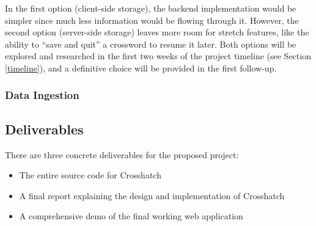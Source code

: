 \documentclass{article}
\begin{document}
In the first option (client-side storage), the backend implementation would be simpler since much less information
would be flowing through it. However, the second option (server-side storage) leaves more room
for stretch features, like the ability to ``save and quit'' a crossword to resume it later.
Both options will be explored and researched in the first two weeks of the project timeline (see Section \ref{timeline}), and a definitive choice will be provided in the first follow-up.

\subsubsection{Data Ingestion}
\label{ingestarch}




\subsection{Deliverables}
There are three concrete deliverables for the proposed project:
\begin{itemize}
  \item The entire source code for Crosshatch
  \item A final report explaining the design and implementation of Crosshatch
  \item A comprehensive demo of the final working web application
\end{itemize}
\end{document}
